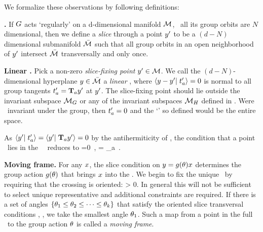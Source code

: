 \begin{description}
 We formalize these observations by following definitions:

\begin{definition}
\textbf{\Slice.} If $G$ acts `regularly' on a d-dimensional
manifold ${\cal M}$, \ie\ all its group orbits are $N$ dimensional, then
we define a
\emph{slice} through a
point ${y'}$ to be a $(d\!-\!N)$ dimensional submanifold $\bar{\cal M}$
such that all group orbits in an open neighborhood of ${y'}$
intersect $\bar{\cal M}$ transversally and only once.
\end{definition}

\begin{definition}
\label{def:slice}
\textbf{Linear \slice.}
Pick a non-zero \emph{slice-fixing point} ${y'} \in {\cal M}$.
We call the $(d\!-\!N)$-dimensional hyperplane $y \in \bar{\cal M}$
a \emph{linear \slice}, where
\(
\braket{\sspRed - \slicep}{\sliceTan{a}}=0
\) %
is normal to all group tangents $ t'_{a}= \mathbf{T}_a {y'}$ at ${y'}$. The {slice-fixing point} should lie outside the invariant subspace ${\cal M}_{G}$ or any of the invariant subspaces ${\cal M}_H$ defined in . Were \slicep\ invariant under the group, then $t'_{a}=0$ and the `\slice' so defined would be the entire space.

As $ \braket{\slicep}{\sliceTan{a}}=\braket{\slicep}{\Lg_a \slicep} =0 $
by the antihermiticity of \Lg, the condition that a point \sspRed\ lies
in the \slice\ \pSRed\ reduces to
\beq
{}=0
    \,,\qquad
{} = \Lg_a \slicep
\,.
\end{definition}


\begin{definition}
\label{def:movingFrame}
\textbf{Moving frame.}
For any $x$, the slice condition  on $y =
g({\bf \theta})x$ determines the group
action $g({\bf \theta})$ that brings $ x$ into the \slice.
We begin to fix the unique \reducedsp\ by requiring that the crossing is
oriented:
\beq
\braket{\groupTan_{}(\ssp)}{\sliceTan{}} > 0.
In general this will not be sufficient to select unique representative and additional constraints are required.
If there is a set of angles
$\{{\bf \theta}_1\leq{\bf \theta}_2\leq\cdots\leq{\bf \theta}_k \}$ that
satisfy the oriented slice transversal conditions
, , we take the
smallest angle ${\bf \theta}_1$.
Such a map from a point in the full \statesp\ to the group action
${\bf \theta}$ is called a
\emph{moving frame}.
\end{definition}


\end{description}
